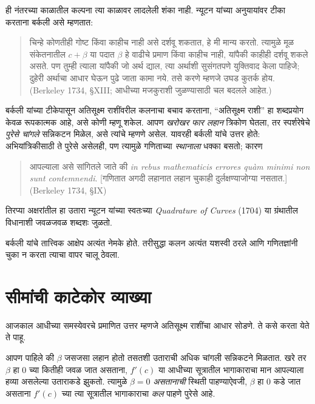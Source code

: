 ही नंतरच्या काळातील कल्पना त्या काळावर लादलेली शंका नाही. न्यूटन यांच्या अनुयायांवर टीका करताना बर्कली असे म्हणतात:
\begin{quote}
चिन्हे कोणतीही गोष्ट किंवा काहीच नाही असे दर्शवू शकतात, हे मी मान्य करतो. त्यामुळे मूळ संकेतनातील $c + \beta$ या पदात $\beta$ हे वाढीचे प्रमाण किंवा काहीच नाही, यांपैकी काहीही दर्शवू शकले असते. पण तुम्ही त्याला यांपैकी जो अर्थ द्याल, त्या अर्थाशी सुसंगतपणे युक्तिवाद केला पाहिजे; दुहेरी अर्थाचा आधार घेऊन पुढे जाता कामा नये. तसे करणे म्हणजे उघड कुतर्क होय. (Berkeley 1734, \S{}XIII; आधीच्या मजकुराशी जुळण्यासाठी चल बदलले आहेत.)
\end{quote}
बर्कली यांच्या टीकेपासून अतिसूक्ष्म राशींवरील कलनाचा बचाव करताना, “अतिसूक्ष्म राशी” हा शब्दप्रयोग केवळ रूपकात्मक आहे, असे कोणी म्हणू शकेल. आपण \emph{खरोखर फार लहान} त्रिकोण घेतला, तर स्पर्शरेषेचे \emph{पुरेसे चांगले} सन्निकटन मिळेल, असे त्यांचे म्हणणे असेल. यावरही बर्कली यांचे उत्तर होते: अभियांत्रिकीसाठी ते पुरेसे असेलही, पण त्यामुळे गणिताच्या \emph{स्थानाला} धक्का बसतो; कारण
\begin{quote}
आपल्याला असे सांगितले जाते की \emph{in rebus mathematicis errores qu\`{a}m minimi
non sunt contemnendi}. [गणितात अगदी लहानात लहान चुकाही दुर्लक्षण्याजोग्या नसतात.] (Berkeley 1734, \S{}IX)
\end{quote}
तिरप्या अक्षरांतील हा उतारा न्यूटन यांच्या स्वतःच्या \emph{Quadrature of Curves} (1704) या ग्रंथातील विधानाशी जवळजवळ शब्दशः जुळतो.

बर्कली यांचे तात्त्विक आक्षेप अत्यंत नेमके होते. तरीसुद्धा कलन अत्यंत यशस्वी ठरले आणि गणितज्ञांनी चुका न करता त्याचा वापर चालू ठेवला.












\section{सीमांची काटेकोर व्याख्या}\label{his:set:limits:sec}

आजकाल आधीच्या समस्येवरचे प्रमाणित उत्तर म्हणजे अतिसूक्ष्म राशींचा आधार सोडणे. ते कसे करता येते ते पाहू.

आपण पाहिले की $\beta$ जसजसा लहान होतो तसतशी उताराची अधिक चांगली सन्निकटने मिळतात. खरे तर $\beta$ हा $0$ च्या कितीही जवळ जात असताना, $f'(c)$ या आधीच्या सूत्रातील भागाकाराचा मान आपल्याला हव्या असलेल्या उताराकडे झुकतो. त्यामुळे $\beta = 0$ \emph{असतानाची} स्थिती पाहण्याऐवजी, $\beta$ हा $0$ कडे जात असताना $f'(c)$ च्या त्या सूत्रातील भागाकाराचा \emph{कल} पाहणे पुरेसे आहे.

